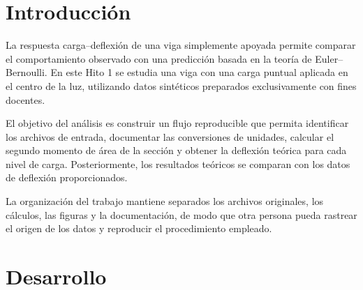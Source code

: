 \begin{abstract}
Se analizó una viga simplemente apoyada con una carga puntual aplicada en el centro de la luz, utilizando datos sintéticos entregados con fines docentes. El caso considera una sección rectangular de ancho \SI{0,2}{\meter} y altura \SI{0,4}{\meter}, una luz de \SI{4}{\meter} y un módulo de elasticidad de \SI{25}{\giga\pascal}. A partir de estos parámetros se realizó el cálculo del segundo momento de área y de la deflexión teórica mediante el modelo de Euler--Bernoulli para una carga puntual centrada. Posteriormente, se compararon las deflexiones teóricas con las deflexiones medidas para cargas entre \SI{0}{\kilo\newton} y \SI{40}{\kilo\newton}. La diferencia relativa máxima obtenida fue de \SI{4}{\percent}, correspondiente a la carga de \SI{5}{\kilo\newton}, mientras que para \SI{40}{\kilo\newton} la deflexión medida fue de \SI{2,05}{\milli\meter} frente a una deflexión teórica de \SI{2,00}{\milli\meter}. Los resultados muestran una concordancia cercana entre ambas series y una respuesta aproximadamente lineal. Finalmente, se realizaron verificaciones independientes del segundo momento de área y de valores puntuales de la deflexión teórica.
\end{abstract}


\section{Introducción}

La respuesta carga--deflexión de una viga simplemente apoyada permite comparar el comportamiento observado con una predicción basada en la teoría de Euler--Bernoulli. En este Hito 1 se estudia una viga con una carga puntual aplicada en el centro de la luz, utilizando datos sintéticos preparados exclusivamente con fines docentes.

El objetivo del análisis es construir un flujo reproducible que permita identificar los archivos de entrada, documentar las conversiones de unidades, calcular el segundo momento de área de la sección y obtener la deflexión teórica para cada nivel de carga. Posteriormente, los resultados teóricos se comparan con los datos de deflexión proporcionados.

La organización del trabajo mantiene separados los archivos originales, los cálculos, las figuras y la documentación, de modo que otra persona pueda rastrear el origen de los datos y reproducir el procedimiento empleado.


\section{Desarrollo}


